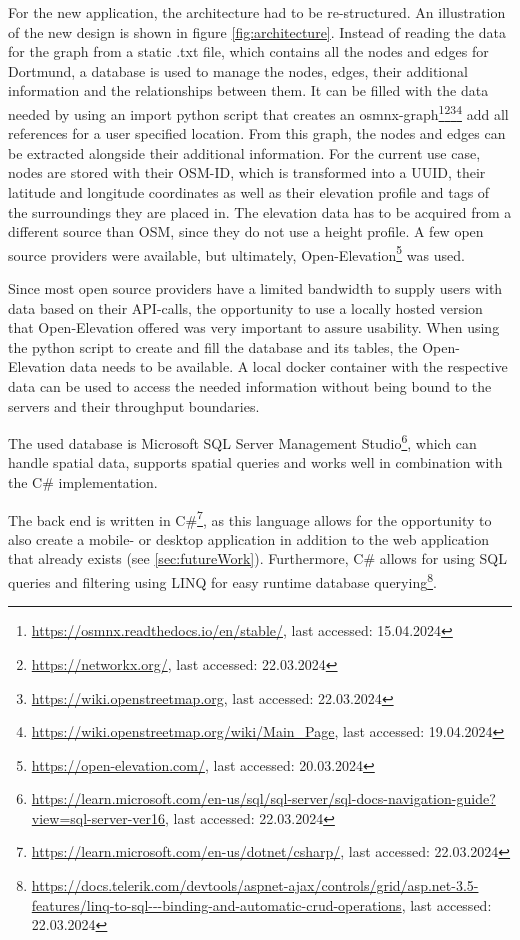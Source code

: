 For the new application, the architecture had to be re-structured.
An illustration of the new design is shown in figure \ref{fig:architecture}.
Instead of reading the data for the graph from a static .txt file, which contains all the nodes and edges for Dortmund, a database is used to manage the nodes, edges, their additional information and the relationships between them. 
It can be filled with the data needed by using an import python script that creates an osmnx-graph\footnote{\url{https://osmnx.readthedocs.io/en/stable/}, last accessed: 15.04.2024}\footnote{\url{https://networkx.org/}, last accessed: 22.03.2024}\footnote{\url{https://wiki.openstreetmap.org}, last accessed: 22.03.2024}\footnote{\url{https://wiki.openstreetmap.org/wiki/Main_Page}, last accessed: 19.04.2024} add all references for a user specified location. 
From this graph, the nodes and edges can be extracted alongside their additional information.
For the current use case, nodes are stored with their OSM-ID, which is transformed into a UUID, their latitude and longitude coordinates as well as their elevation profile and tags of the surroundings they are placed in.
The elevation data has to be acquired from a different source than OSM, since they do not use a height profile. 
A few open source providers were available, but ultimately, Open-Elevation\footnote{\url{https://open-elevation.com/}, last accessed: 20.03.2024} was used. 

Since most open source providers have a limited bandwidth to supply users with data based on their API-calls, the opportunity to use a locally hosted version that Open-Elevation offered was very important to assure usability.
When using the python script to create and fill the database and its tables, the Open-Elevation data needs to be available.
A local docker container with the respective data can be used to access the needed information without being bound to the servers and their throughput boundaries.

The used database is Microsoft SQL Server Management Studio\footnote{\url{https://learn.microsoft.com/en-us/sql/sql-server/sql-docs-navigation-guide?view=sql-server-ver16}, last accessed: 22.03.2024}, which can handle spatial data, supports spatial queries and works well in combination with the C\# implementation.

The back end is written in C\#\footnote{\url{https://learn.microsoft.com/en-us/dotnet/csharp/}, last accessed: 22.03.2024}, as this language allows for the opportunity to also create a mobile- or desktop application in addition to the web application that already exists (see \ref{sec:futureWork}).
Furthermore, C\# allows for using SQL queries and filtering using LINQ for easy runtime database querying\footnote{\url{https://docs.telerik.com/devtools/aspnet-ajax/controls/grid/asp.net-3.5-features/linq-to-sql---binding-and-automatic-crud-operations}, last accessed: 22.03.2024}.


